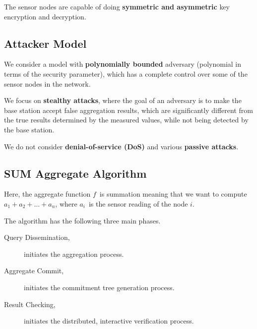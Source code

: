 \documentclass[%
  slidesonly,%
  semlayer%
  ]{seminar}                                  %
\begin{document}
\begin{slide}
      The sensor nodes are capable of doing \textbf{symmetric and asymmetric} key encryption and decryption.

      \clearpage

    \subsection*{Attacker Model}
      We consider a model with \textbf{polynomially bounded} adversary (polynomial in terms of the security parameter), which has a complete control over some of the sensor nodes in the network.
   
      We focus on \textbf{stealthy attacks}, where the goal of an adversary is to make the base station accept false aggregation  results, which are significantly different from the true results determined by the measured values, while not being detected by the base station.
      
      We do not consider \textbf{denial-of-service (DoS)} and various \textbf{passive attacks}.
      \clearpage

    \subsection*{SUM Aggregate Algorithm}
      Here, the aggregate function $f$\ is summation meaning that we want to compute $a_{1} + a_{2} + \dotsc + a_{n}$, where $a_{i}$\ is the sensor reading of the node $i$.
 
      The algorithm has the following three main phases.
      \begin{description}
        \item [Query Dissemination,] initiates the aggregation process.
        \item [Aggregate Commit,] initiates the commitment tree generation process.
        \item [Result Checking,] initiates the distributed, interactive verification process.
      \end{description}
      \clearpage


\end{slide}
\end{document}
